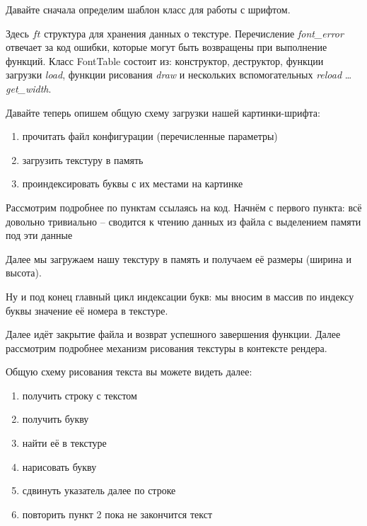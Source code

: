 \pagebreak

Давайте сначала определим шаблон класс для работы с шрифтом.


Здесь \( ft \) структура для хранения данных о текстуре. Перечисление \emph{font\_error} 
отвечает за код ошибки, которые могут быть возвращены при выполнение функций. Класс 
FontTable состоит из: конструктор, деструктор, функции загрузки \emph{load}, 
функции рисования \emph{draw} и нескольких вспомогательных \emph{reload} \ldots 
\emph{get\_width}.

Давайте теперь опишем общую схему загрузки нашей картинки-шрифта:
\begin{enumerate}\itemsep-5pt
    \item прочитать файл конфигурации (перечисленные параметры)
    \item загрузить текстуру в память
    \item проиндексировать буквы с их местами на картинке
\end{enumerate}

Рассмотрим подробнее по пунктам ссылаясь на код. Начнём с первого пункта: всё довольно 
тривиально -- сводится к чтению данных из файла с выделением памяти под эти данные


Далее мы загружаем нашу текстуру в память и получаем её размеры (ширина и высота).


Ну и под конец главный цикл индексации букв: мы вносим в массив по индексу буквы значение 
её номера в текстуре.


Далее идёт закрытие файла и возврат успешного завершения функции. Далее рассмотрим подробнее 
механизм рисования текстуры в контексте рендера. 

\pagebreak

Общую схему рисования текста вы можете видеть далее:
\begin{enumerate}\itemsep-5pt
    \item получить строку с текстом
    \item получить букву
    \item найти её в текстуре
    \item нарисовать букву
    \item сдвинуть указатель далее по строке
    \item повторить пункт 2 пока не закончится текст
\end{enumerate}

